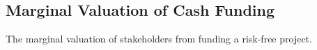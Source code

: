 \documentclass[../../main.tex]{subfiles}
\begin{document}
	\begin{appendices}
		\section{Marginal Valuation of Cash Funding}
		\label{apx:marginal-valuation-cash-funding}
		The marginal valuation of stakeholders from funding a risk-free project.

		\begin{figure}[H]
			\centering
			\resizebox{\textwidth}{!}{%
				
			}
		\end{figure}

	\end{appendices}
\end{document}
